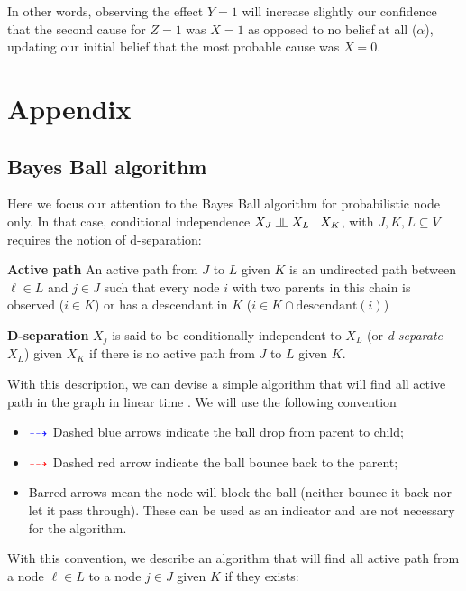 \documentclass{article}
\numberwithin{equation}{section}
\newcommand{\s}{\hspace{0.1cm}}
\newcommand{\indep}{\s \rotatebox[origin=c]{90}{$\models$}\s }
\begin{document}
In other words, observing the effect $Y = 1$ will increase slightly our confidence 
that the second cause for $Z = 1$ was $X = 1$ as opposed to no belief at all 
($\alpha$), updating our initial belief that the 
most probable cause was $X = 0$.



\section{Appendix}
\subsection{Bayes Ball algorithm}
Here we focus our attention to the Bayes Ball algorithm for probabilistic node only. In that 
case, conditional independence $X_J \indep X_L \mid X_K$, with $J,K,L \subseteq V$ requires 
the notion of d-separation:
\begin{description}
        \item{\textbf{Active path}} An active path from $J$ to $L$ given $K$ is 
                an undirected path between $\ell \in L$ and $j \in J$ such that every 
                node $i$ with two parents in this chain is observed ($i \in K$) or 
                has a descendant in $K$ ($i \in K \cap \text{descendant}(i)$)
        \item{\textbf{D-separation}} $X_j$ is said to be conditionally independent to 
                $X_L$ (or 
                \textit{d-separate} $X_L$) given $X_K$ if there is no active path 
                from $J$ to $L$ given $K$.
\end{description}
With this description, we can devise a simple algorithm that will find all active 
path in the graph in linear time \cite{BB}. We will use the following convention 
\begin{itemize}
        \item $\color{blue} \dashrightarrow $ Dashed blue arrows indicate the ball drop from parent to child;
        \item $\color{red} \dashrightarrow$ Dashed red arrow indicate the ball bounce back to the 
                parent;
        \item Barred arrows mean the node will block the ball (neither bounce it back 
                nor let it pass through). These can be used as an indicator and are not 
                necessary for the algorithm.
\end{itemize}
With this convention, we describe an algorithm that will find all active path 
from a node $\ell \in L$ to a node $j \in J$ given 
$K$ if they exists:
\end{document}
